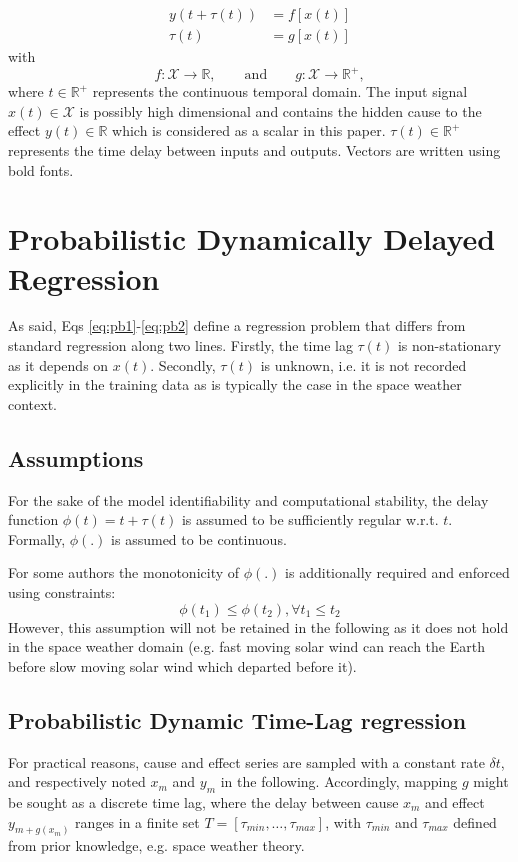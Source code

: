 \begin{align}
y(t + \tau(t)) & = f[x(t)]\label{eq:pb1}\\
\tau(t) & = g[x(t)]\label{eq:pb2} 
\end{align}
with
\[
f: \mathcal{X}  \rightarrow \mathbb{R},\qquad\text{and}\qquad
g: \mathcal{X}  \rightarrow \mathbb{R}^{+},
\]
where $t \in \mathbb{R}^{+}$ represents the continuous temporal domain. The input signal 
$x(t)\in \mathcal{X}$ is possibly high dimensional and contains the hidden cause to 
the effect $y(t)\in\mathbb{R}$ which is considered as a scalar in this paper. 
$\tau(t)\in \mathbb{R}^+$ represents the time delay between inputs and outputs.
Vectors are written using bold fonts.

\section{Probabilistic Dynamically Delayed Regression}\label{sec-formulation}
As said, Eqs \ref{eq:pb1}-\ref{eq:pb2} define a regression problem that differs from standard regression along two lines. 
Firstly, the time lag $\tau(t)$ is non-stationary as it depends on $x(t)$.  
Secondly, $\tau(t)$ is unknown, i.e. it 
is not recorded explicitly in the training data as is typically the case in the space weather context. 
\subsection{Assumptions}
For the sake of the model identifiability and computational stability, the delay function $\phi(t) = t + \tau(t)$ is assumed to be sufficiently regular w.r.t. $t$. Formally,  $\phi(.)$ is assumed to be continuous. %

For some authors  \citep{ZHOU2006195} the monotonicity of $\phi(.)$ is additionally required and enforced using constraints:   $$\phi(t_1) \leq \phi(t_2), \forall t_1 \leq t_2$$
However, this assumption will not be retained in the following as it does not hold in the space weather domain (e.g. fast moving 
solar wind can reach the Earth before slow moving solar wind which departed before it). 

\subsection{Probabilistic Dynamic Time-Lag regression}
For practical reasons, cause and effect series are sampled with a constant rate $\delta t$, and respectively noted ${x_m}$ and ${y_m}$ in the following. Accordingly, mapping $g$ might be sought as a discrete time lag, where the delay between cause $x_m$ and effect $y_{m+g(x_m)}$ ranges in a finite set $T = [\tau_{min}, \ldots, \tau_{max}]$, with  $\tau_{min}$ and  $\tau_{max}$ defined from prior knowledge, e.g. space weather theory. 

